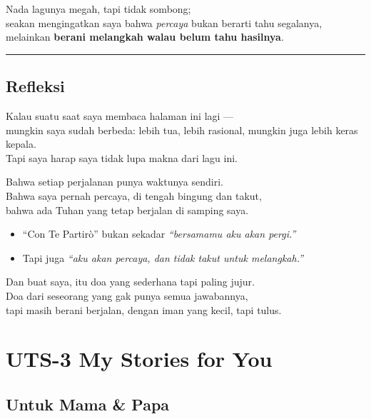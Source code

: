 \documentclass[
  letterpaper,
  DIV=11,
  numbers=noendperiod]{scrreprt}
\providecommand{\tightlist}{%
  \setlength{\itemsep}{0pt}\setlength{\parskip}{0pt}}
\begin{document}
Nada lagunya megah, tapi tidak sombong;\\
seakan mengingatkan saya bahwa \emph{percaya} bukan berarti tahu
segalanya,\\
melainkan \textbf{berani melangkah walau belum tahu hasilnya}.

\begin{center}\rule{0.5\linewidth}{0.5pt}\end{center}

\section{Refleksi}\label{refleksi}

Kalau suatu saat saya membaca halaman ini lagi ---\\
mungkin saya sudah berbeda: lebih tua, lebih rasional, mungkin juga
lebih keras kepala.\\
Tapi saya harap saya tidak lupa makna dari lagu ini.

Bahwa setiap perjalanan punya waktunya sendiri.\\
Bahwa saya pernah percaya, di tengah bingung dan takut,\\
bahwa ada Tuhan yang tetap berjalan di samping saya.

\begin{itemize}
\tightlist
\item
  ``Con Te Partirò'' bukan sekadar \emph{``bersamamu aku akan
  pergi.''}\\
\item
  Tapi juga \emph{``aku akan percaya, dan tidak takut untuk
  melangkah.''}
\end{itemize}

Dan buat saya, itu doa yang sederhana tapi paling jujur.\\
Doa dari seseorang yang gak punya semua jawabannya,\\
tapi masih berani berjalan, dengan iman yang kecil, tapi tulus.


\chapter{UTS-3 My Stories for You}\label{uts-3-my-stories-for-you}

\section{Untuk Mama \& Papa}\label{untuk-mama-papa}
\end{document}
